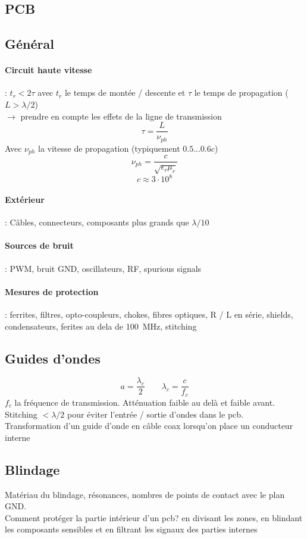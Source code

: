\documentclass[resume]{subfiles}
\begin{document}
\begin{multicols}{3}
\section{PCB}
\subsection{Général}
\paragraph{Circuit haute vitesse} : $t_r < 2\tau$ avec $t_r$ le temps de montée / descente et $\tau$ le temps de propagation ($L > \lambda/2$)\\
$\rightarrow$ prendre en compte les effets de la ligne de transmission
$$\tau=\frac{L}{\nu_{ph}}$$
Avec $\nu_{ph}$ la vitesse de propagation (typiquement $0.5$...$0.6c$)
$$\nu_{ph}=\frac{c}{\sqrt{\epsilon_r\mu_r}}$$
$$c\approx 3\cdot 10^{8}$$
\paragraph{Extérieur} : Câbles, connecteurs, composants plus grands que $\lambda/10$
\paragraph{Sources de bruit} : PWM, bruit GND, oscillateurs, RF, spurious signals
\paragraph{Mesures de protection} : ferrites, filtres, opto-coupleurs, chokes, fibres optiques, R / L en série, shields, condensateurs, ferites au dela de \SI{100}{\mega\hertz}, stitching
\subsection{Guides d'ondes}
$$a=\frac{\lambda_c}{2}\qquad \lambda_c=\frac{c}{f_c}$$
$f_c$ la fréquence de transmission. Atténuation faible au delà et faible avant. Stitching $<\lambda/2$ pour éviter l'entrée / sortie d'ondes dans le pcb.\\
Transformation d'un guide d'onde en câble coax lorsqu'on place un conducteur interne
\subsection{Blindage}
Matériau du blindage, résonances, nombres de points de contact avec le plan GND.\\
Comment protéger la partie intérieur d'un pcb? en divisant les zones, en blindant les composants sensibles et en filtrant les signaux des parties internes

\end{multicols}
\end{document}
